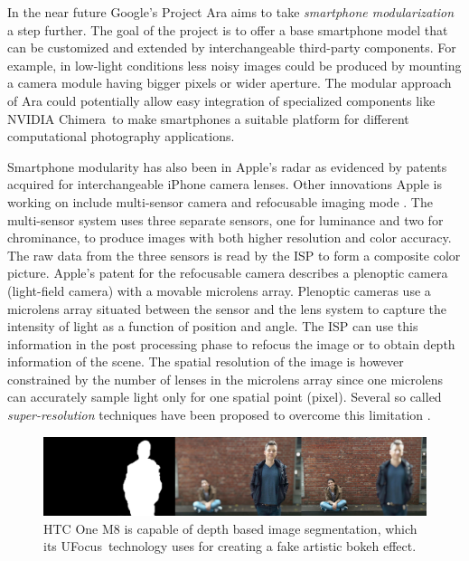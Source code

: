 \documentclass[thesis.tex]{subfiles}
\begin{document}
In the near future Google's Project Ara aims to take \textit{smartphone modularization} a step further. The goal of the project is to offer a base smartphone model that can be customized and extended by interchangeable third-party components. For example, in low-light conditions less noisy images could be produced by mounting a camera module having bigger pixels or wider aperture. The modular approach of Ara could potentially allow easy integration of specialized components like NVIDIA Chimera\texttrademark\ to make smartphones a suitable platform for different computational photography applications.

Smartphone modularity has also been in Apple's radar as evidenced by patents \cite{apple_patent_camera_module_3}\cite{apple_patent_camera_module_4}\cite{apple_patent_camera_module_5} acquired for interchangeable iPhone camera lenses. Other innovations Apple is working on include multi-sensor camera and refocusable imaging mode \cite{apple_patent_camera_module_1}\cite{apple_patent_camera_module_2}. The multi-sensor system uses three separate sensors, one for luminance and two for chrominance, to produce images with both higher resolution and color accuracy. The raw data from the three sensors is read by the ISP to form a composite color picture. Apple's patent for the refocusable camera describes a plenoptic camera (light-field camera) with a movable microlens array. Plenoptic cameras use a microlens array situated between the sensor and the lens system to capture the intensity of light as a function of position and angle. The ISP can use this information in the post processing phase to refocus the image or to obtain depth information of the scene. The spatial resolution of the image is however constrained by the number of lenses in the microlens array since one microlens can accurately sample light only for one spatial point (pixel). Several so called \textit{super-resolution} techniques have been proposed to overcome this limitation \cite{plenoptic_1}\cite{plenoptic_2}\cite{plenoptic_3}.

\begin{figure}[ht]
\centering \includegraphics[width=\textwidth]{images/htc-ufocus.jpg}
\caption{HTC One M8 is capable of depth based image segmentation, which its UFocus\texttrademark\ technology uses for creating a fake artistic bokeh effect.\label{figure:htc-ufocus}}
\end{figure}
\end{document}
